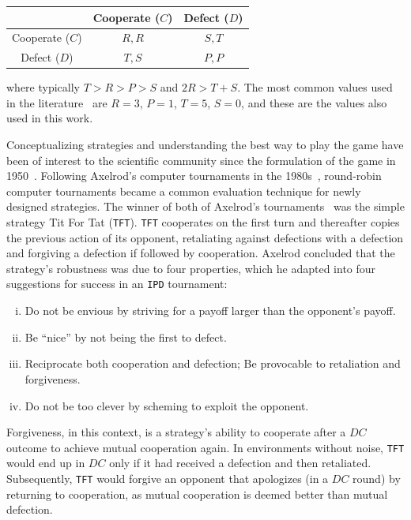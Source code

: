\documentclass{article}
\def\TFT{\texttt{TFT}}
\def\IPD{\texttt{IPD}}
\begin{document}
\begin{center}
{\renewcommand{\arraystretch}{2}%
\begin{tabular}{c|c|c}
& Cooperate (\(C\)) & Defect (\(D\)) \\
\hline
Cooperate (\(C\)) & \(R, R\) & \(S, T\) \\
\hline
Defect (\(D\)) & \(T, S\) & \(P, P\) \\
\end{tabular}}
\end{center}

where typically \(T > R > P > S\) and \(2R > T + S\). The most common values
used in the literature~\cite{Axelrod1981} are \(R=3\), \(P=1\), \(T=5\),
\(S=0\), and these are the values also used in this work.

Conceptualizing strategies and understanding the best way to play the game have
been of interest to the scientific community since the formulation of the game
in 1950~\cite{Flood1958}. Following Axelrod's computer tournaments in the
1980s~\cite{Axelrod1980a, Axelrod1980b}, round-robin computer tournaments became
a common evaluation technique for newly designed strategies.
The winner of both of Axelrod's tournaments~\cite{Axelrod1980a, Axelrod1980b}
was the simple strategy Tit For Tat (\TFT{}). \TFT{} cooperates on the first turn
and thereafter copies the previous action of its opponent, retaliating against
defections with a defection and forgiving a defection if followed by
cooperation. Axelrod concluded that the strategy's robustness was due to four
properties, which he adapted into four suggestions for success in an \IPD{}
tournament:

\begin{enumerate}[(i)]
    \item Do not be envious by striving for a payoff larger than the opponent's payoff.
    \item Be ``nice'' by not being the first to defect.
    \item Reciprocate both cooperation and defection; Be provocable to retaliation and forgiveness.
    \item Do not be too clever by scheming to exploit the opponent.
\end{enumerate}

Forgiveness, in this context, is a strategy's ability to cooperate after a
\(DC\) outcome to achieve mutual cooperation again. In environments without
noise, \TFT{} would end up in \(DC\) only if it had received a defection and
then retaliated. Subsequently, \TFT{} would forgive an opponent that apologizes
(in a \(DC\) round) by returning to cooperation, as mutual cooperation is deemed
better than mutual defection.
\end{document}
